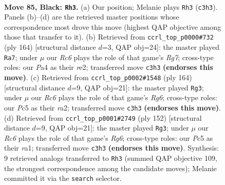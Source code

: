 \documentclass[11pt]{article}
\begin{document}
\clearpage

\begin{figure}[p]\centering
\begin{subfigure}{0.46\textwidth}\centering
\resizebox{\linewidth}{!}{%
\newchessgame
\chessboard[
  setfen={8/8/8/2p2k2/p2p4/2r5/3K4/8 b - - 11 85},
  showmover=false,
  pgfstyle=straightmove, color=movearrow, markmove={c3-h3}
]}
\caption{}
\end{subfigure}\hfill
\begin{subfigure}{0.46\textwidth}\centering
\resizebox{\linewidth}{!}{%
\newchessgame
\chessboard[
  setfen={7k/6R1/7P/6P1/3K4/8/4r3/8 w - - 15 83},
  showmover=false,
  pgfstyle=straightmove, color=movearrow, markmove={g7-a7}
]}
\caption{}
\end{subfigure}
\\[4pt]
\begin{subfigure}{0.46\textwidth}\centering
\resizebox{\linewidth}{!}{%
\newchessgame
\chessboard[
  setfen={8/5k2/6R1/7P/5P1K/8/r7/8 w - - 9 83},
  showmover=false,
  pgfstyle=straightmove, color=movearrow, markmove={g6-g3}
]}
\caption{}
\end{subfigure}\hfill
\begin{subfigure}{0.46\textwidth}\centering
\resizebox{\linewidth}{!}{%
\newchessgame
\chessboard[
  setfen={8/5k2/6R1/7P/5P1K/8/8/r7 w - - 5 77},
  showmover=false,
  pgfstyle=straightmove, color=movearrow, markmove={g6-g3}
]}
\caption{}
\end{subfigure}
\caption{\textbf{Move 85, Black: \texttt{Rh3}.} (a) Our position; Melanie plays \texttt{Rh3} (\texttt{c3h3}). Panels (b)--(d) are the retrieved master positions whose correspondence most drove this move (highest QAP objective among those that transfer to it). (b) Retrieved from \texttt{ccrl\_top\_p0000\#732} (ply 164) [structural distance $d$=3, QAP obj=24]: the master played \texttt{Ra7}; under $\mu$ our \emph{Rc6} plays the role of that game's \emph{Rg7}; cross-type roles: our \emph{P}a4 as their \emph{r}e2; transferred move \texttt{c3h3} \textbf{(endorses this move)}. (c) Retrieved from \texttt{ccrl\_top\_p0002\#1548} (ply 164) [structural distance $d$=9, QAP obj=21]: the master played \texttt{Rg3}; under $\mu$ our \emph{Rc6} plays the role of that game's \emph{Rg6}; cross-type roles: our \emph{P}c5 as their \emph{r}a2; transferred move \texttt{c3h3} \textbf{(endorses this move)}. (d) Retrieved from \texttt{ccrl\_top\_p0001\#2749} (ply 152) [structural distance $d$=9, QAP obj=21]: the master played \texttt{Rg3}; under $\mu$ our \emph{Rc6} plays the role of that game's \emph{Rg6}; cross-type roles: our \emph{P}c5 as their \emph{r}a1; transferred move \texttt{c3h3} \textbf{(endorses this move)}. Synthesis: 9 retrieved analogs transferred to \texttt{Rh3} (summed QAP objective 109, the strongest correspondence among the candidate moves); Melanie committed it via the \texttt{search} selector.}
\label{fig:thought-m169}
\end{figure}
\end{document}
